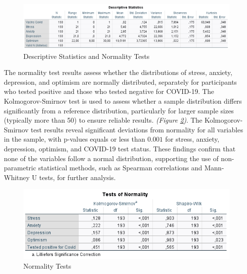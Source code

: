 \documentclass[a4paper]{article}
\begin{document}
\begin{figure}[ht]
  \centering
  \caption{Descriptive Statistics and Normality Tests}
  \label{fig:descriptiveSts}
  \includegraphics[width=\textwidth]{img/descriptive_statistics.png}  %
\end{figure}

\vspace{3em}
\noindent
The normality test results assess whether the distributions of stress, anxiety, depression, and optimism are normally distributed,
separately for participants who tested positive and those who tested negative for COVID-19.
The Kolmogorov-Smirnov test is used to assess whether a sample distribution differs significantly from a reference distribution,
particularly for larger sample sizes (typically more than 50) to ensure reliable results. \textit{(Figure \ref{fig:normalityTest})}.
\vspace{0.5em}\newline
The Kolmogorov-Smirnov test results reveal significant deviations from normality for all variables in the sample,
with p-values equals or less than \(\boldsymbol{0.001}\) for stress, anxiety, depression, optimism, and COVID-19 test status.
These findings confirm that none of the variables follow a normal distribution, supporting the use of non-parametric statistical methods,
such as Spearman correlations and Mann-Whitney U tests, for further analysis.
\vspace{1.5em}

\begin{figure}[H]
  \centering
  \caption{Normality Tests}
  \label{fig:normalityTest}
  \includegraphics[width=\textwidth]{img/normality_test.png}  %
\end{figure}
\end{document}
